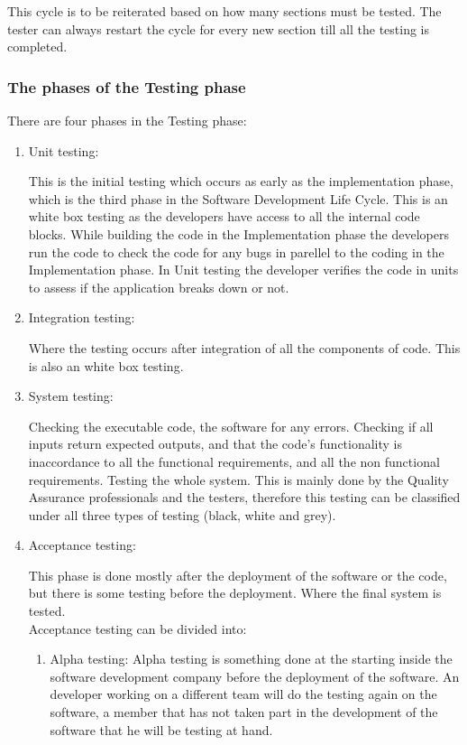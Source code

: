 \documentclass[a4paper]{article}
\begin{document}
This cycle is to be reiterated based on how many sections must be tested. The tester can always restart the cycle for every new section till all the
testing is completed.
\subsubsection{The phases of the Testing phase}

There are four phases in the Testing phase: 

\begin{enumerate}
    \item Unit testing: 

        This is the initial testing which occurs as early as the implementation phase, which is the third phase in the Software Development Life
        Cycle. This is an white box testing as the developers have access to all the internal code blocks.
        While building the code in the Implementation 
        phase the developers run the code to check the code for any bugs in parellel to the coding in the Implementation phase. In Unit testing
        the developer verifies the code in units to assess if the application breaks down or not.

    \item Integration testing:

Where the testing occurs after integration of all the components of code. This is also an white box testing.

    \item System testing:

Checking the executable code, the software for any errors. Checking if all inputs return expected outputs, and that the code's functionality is 
inaccordance to all the functional requirements, and all the non functional requirements. Testing the whole system. This is mainly done by the 
Quality Assurance professionals and the testers, therefore this testing can be classified under all three types of testing (black, white and grey).

    \item Acceptance testing:  

    This phase is done mostly after the deployment of the software or the code, but there is some testing
    before the deployment. Where the final system is tested.\\
    Acceptance testing can be divided into:
    
    \begin{enumerate}
        \item Alpha testing: 
            Alpha testing is something done at the starting inside the software development company before the 
            deployment of the software. An developer
            working on a different team will do the testing again on the software, a member that has not taken part in the development of the software
            that he will be testing at hand.


\end{enumerate}
\end{enumerate}
\end{document}
